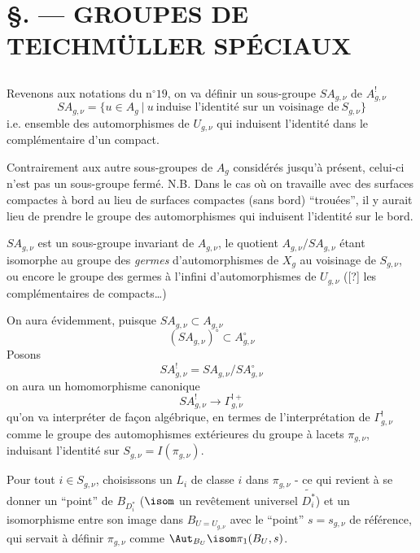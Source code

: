 

\chapter*{\S {}. --- GROUPES DE TEICHMÜLLER SPÉCIAUX}\thispagestyle{empty}
\label{sec:25}
\section*{}

Revenons aux notations du n$^\circ 19$, on va définir un sous-groupe $S A_{g, \nu}$ de $A^!_{g, \nu}$
$$
S A_{g, \nu} = \{ u \in A_g~|~u~\text{induise l'identité sur un voisinage de}~S_{g, \nu} \}
$$
i.e. ensemble des automorphismes de $U_{g, \nu}$ qui induisent l'identité dans le complémentaire d'un compact.

Contrairement aux autre sous-groupes de $A_g$ considérés jusqu'à présent, celui-ci n'est pas un sous-groupe fermé. N.B. Dans le cas où on travaille avec des surfaces compactes à bord au lieu de surfaces compactes (sans bord) ``trouées'', il y aurait lieu de prendre le groupe des automorphismes qui induisent l'identité sur le bord. 

$S A_{g, \nu}$ est un sous-groupe invariant de $A_{g, \nu}$, le quotient $A_{g, \nu}/SA_{g, \nu}$ étant isomorphe au groupe des \emph{germes} d'automorphismes de $X_g$ au voisinage de $S_{g, \nu}$, ou encore le groupe des germes à l'infini d'automorphismes de $U_{g, \nu}$ ([?] les complémentaires de compacts\dots)

On aura évidemment, puisque $SA_{g, \nu} \subset  A_{g, \nu}$
$$
(SA_{g, \nu})^\circ \subset  A^\circ_{g, \nu}
$$
Posons
$$
S A^!_{g, \nu} = SA_{g, \nu}/SA^\circ_{g, \nu}
$$
on aura un homomorphisme canonique
$$
SA^!_{g, \nu} \to \Gamma_{g, \nu}^{!+}
$$
qu'on va interpréter de fa\c{c}on algébrique, en termes de l'interprétation de $\Gamma^!_{g, \nu}$ comme le groupe des automophismes extérieures du groupe à lacets $\pi_{g, \nu}$, induisant l'identité sur $S_{g, \nu} = I(\pi_{g, \nu})$.

Pour tout $i \in S_{g, \nu}$, choisissons un $L_i$ de classe $i$ dans $\pi_{g, \nu}$ - ce qui revient à se donner un ``point'' de $B_{D^*_i}$ ($\isom$ un revêtement universel $\widetilde{D^*_i}$) et un isomorphisme entre son image dans $B_{U = U_{g, \nu}}$ avec le ``point'' $s = s_{g, \nu}$ de référence, qui servait à définir $\pi_{g, \nu}$ comme $\Aut_{B_U} \isom \pi_1(B_U, s)$.

